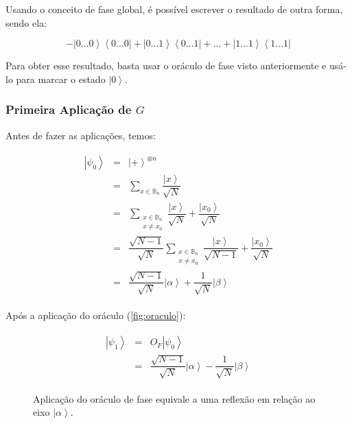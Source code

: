 Usando o conceito de fase global, é possível escrever o resultado de
outra forma, sendo ela:

\[-\left| 0\dots 0 \right\rangle \left\langle 0 \dots 0 \right| + \left| 0 \dots 1 \right\rangle \left\langle 0 \dots 1 \right| + \dots + \left| 1 \dots 1\right\rangle \left\langle 1 \dots 1 \right|\]

Para obter esse resultado, basta usar o oráculo de fase visto
anteriormente e usá-lo para marcar o estado \(\left| 0 \right\rangle\).

\subsubsection{Primeira Aplicação de \(G\)}\label{subsubsec:primeira-aplicacao-de-g}

Antes de fazer as aplicações, temos:

\[\begin{aligned}
\begin{matrix}
\left| \psi_0 \right\rangle &=& \left| + \right\rangle^{\otimes n} \\
&=& \sum_{x \in \mathbb{B}_n} \dfrac{\left| x \right\rangle}{\sqrt{N}} \\
&=& \sum_{\substack{x \in \mathbb{B}_n \\ x \ne x_0}}\dfrac{\left| x \right\rangle}{\sqrt{N}} + \dfrac{\left| x_0 \right\rangle}{\sqrt{N}} \\
&=& \dfrac{\sqrt{N - 1}}{\sqrt{N}}\sum_{\substack{x \in \mathbb{B}_n \\ x \ne x_0}}\dfrac{\left| x \right\rangle}{\sqrt{N - 1}} + \dfrac{\left| x_0 \right\rangle}{\sqrt{N}} \\
&=& \dfrac{\sqrt{N - 1}}{\sqrt{N}} \left| \alpha \right\rangle + \dfrac{1}{\sqrt{N}} \left| \beta \right\rangle
\end{matrix}
\end{aligned}\]

Após a aplicação do oráculo (\autoref{fig:oraculo}):

\[\begin{aligned}
\begin{matrix}
\left| \psi_1 \right\rangle &=& O_F \left| \psi_0 \right\rangle \\
&=& \dfrac{\sqrt{N - 1}}{\sqrt{N}} \left| \alpha \right\rangle - \dfrac{1}{\sqrt{N}} \left| \beta \right\rangle
\end{matrix}
\end{aligned}\]

\begin{figure}[!htb]
  \centering
  
  \caption{Aplicação do oráculo de fase equivale a uma reflexão em relação ao eixo \(\left| \alpha \right\rangle\)\cite{giovani}.}
  \label{fig:oraculo}
\end{figure}

